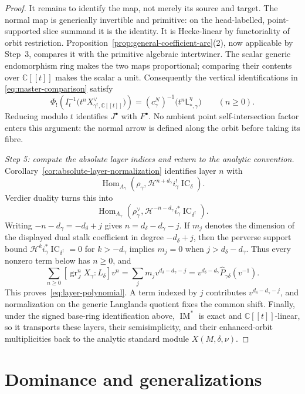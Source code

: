 \documentclass[11pt]{amsart}
\theoremstyle{definition}
\theoremstyle{remark}
\newcommand{\C}{\mathbb C}
\newcommand{\A}{\C[[t]]}
\newcommand{\IC}{\operatorname{IC}}
\begin{document}
\begin{proof}
It remains to identify the map, not merely its source and target.
The normal map is generically invertible and primitive: on the
head-labelled, point-supported slice summand it is the identity.
It is Hecke-linear by functoriality of orbit restriction.
Proposition~\ref{prop:general-coefficient-arc}(2), now applicable by
Step~3, compares it with the primitive algebraic intertwiner.
The scalar generic endomorphism ring makes the two maps proportional; comparing
their contents over $\A$ makes the scalar a unit.
Consequently the vertical identifications in
\eqref{eq:master-comparison} satisfy
\[
 \Phi_!\!\left(I_t^{-1}
       \bigl(t^nX_{\gamma^\dagger,\A}^{\vee}\bigr)\right)
 =(c_\gamma^N)^{-1}
       \bigl(t^n\mathsf L_{*,\gamma}^{\eta}\bigr)
 \qquad(n\geq0).
\]
Reducing modulo $t$ identifies $J^\bullet$ with $F^\bullet$.
No ambient point self-intersection factor enters this argument:
the normal arrow is defined along the orbit before taking its fibre.

\smallskip
\noindent\emph{Step 5: compute the absolute layer indices and return to the
analytic convention.}
Corollary~\ref{cor:absolute-layer-normalization} identifies layer $n$ with
\[
 \operatorname{Hom}_{A_\gamma}\!\left(
  \rho_\gamma,
  \mathcal H^{n+d_\gamma}i_\gamma^!\IC_\delta
 \right).
\]
Verdier duality turns this into
\[
 \operatorname{Hom}_{A_\gamma}\!\left(
  \rho_\gamma^\vee,
  \mathcal H^{-n-d_\gamma}i_\gamma^*\IC_{\delta^\dagger}
 \right).
\]
Writing $-n-d_\gamma=-d_\delta+j$ gives
$n=d_\delta-d_\gamma-j$.  If $m_j$ denotes the dimension of the displayed
dual stalk coefficient in degree $-d_\delta+j$, then the perverse support
bound $\mathcal H^ki_\gamma^*\IC_{\delta^\dagger}=0$ for
$k>-d_\gamma$ implies
$m_j=0$ when $j>d_\delta-d_\gamma$.  Thus every nonzero term below has
$n\geq0$, and
\[
 \sum_{n\geq0}[\operatorname{gr}_J^nX_\gamma:L_\delta]v^n
 =\sum_jm_jv^{d_\delta-d_\gamma-j}
 =v^{d_\delta-d_\gamma}\widehat P_{\gamma\delta}(v^{-1}).
\]
This proves~\eqref{eq:layer-polynomial}.  A term indexed by $j$
contributes $v^{d_\delta-d_\gamma-j}$, and normalization on the generic
Langlands quotient fixes the common shift.  Finally, under the signed
base-ring identification above,
$\operatorname{IM}^*$ is exact and $\mathbb C[[t]]$-linear, so it transports
these layers, their semisimplicity, and their enhanced-orbit multiplicities
back to the analytic standard module $X(M,\delta,\nu)$.
\end{proof}

\section{Dominance and generalizations}
\label{sec:dominance}
\end{document}
